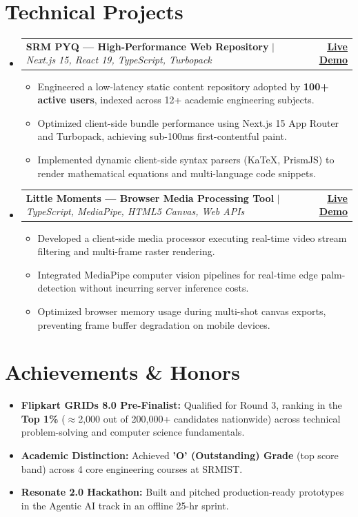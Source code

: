 \documentclass[letterpaper,10pt]{article}
\makeatletter
\newcommand{\resumeItem}[1]{
  \item\small{
    {#1 \vspace{-2pt}}
  }
}
\newcommand{\resumeProjectHeading}[2]{
    \item
    \begin{tabular*}{1.0\textwidth}[t]{l@{\extracolsep{\fill}}r}
      \small#1 & \textbf{\small #2}\\
    \end{tabular*}\vspace{-4pt}
}
\newcommand{\resumeSubHeadingListStart}{\begin{itemize}[leftmargin=0.0in, label={}]}
\newcommand{\resumeSubHeadingListEnd}{\end{itemize}}
\newcommand{\resumeItemListStart}{\begin{itemize}[leftmargin=0.15in, label=\raisebox{0.15ex}{\tiny$\bullet$}, itemsep=1.5pt]}
\newcommand{\resumeItemListEnd}{\end{itemize}\vspace{-3pt}}
\makeatother
\begin{document}
\section{Technical Projects}
    \resumeSubHeadingListStart
      \resumeProjectHeading
          {\textbf{SRM PYQ --- High-Performance Web Repository} $|$ \emph{Next.js 15, React 19, TypeScript, Turbopack}}{\href{https://srm-pyq.vercel.app/}{\underline{Live Demo}}}
          \resumeItemListStart
            \resumeItem{Engineered a low-latency static content repository adopted by \textbf{100+ active users}, indexed across 12+ academic engineering subjects.}
            \resumeItem{Optimized client-side bundle performance using Next.js 15 App Router and Turbopack, achieving sub-100ms first-contentful paint.}
            \resumeItem{Implemented dynamic client-side syntax parsers (KaTeX, PrismJS) to render mathematical equations and multi-language code snippets.}
          \resumeItemListEnd

      \resumeProjectHeading
          {\textbf{Little Moments --- Browser Media Processing Tool} $|$ \emph{TypeScript, MediaPipe, HTML5 Canvas, Web APIs}}{\href{https://lilmom.vercel.app/}{\underline{Live Demo}}}
          \resumeItemListStart
            \resumeItem{Developed a client-side media processor executing real-time video stream filtering and multi-frame raster rendering.}
            \resumeItem{Integrated MediaPipe computer vision pipelines for real-time edge palm-detection without incurring server inference costs.}
            \resumeItem{Optimized browser memory usage during multi-shot canvas exports, preventing frame buffer degradation on mobile devices.}
          \resumeItemListEnd
    \resumeSubHeadingListEnd

\section{Achievements \& Honors}
    \resumeSubHeadingListStart
        \resumeItemListStart
            \resumeItem{\textbf{Flipkart GRIDs 8.0 Pre-Finalist:} Qualified for Round 3, ranking in the \textbf{Top 1\%} ($\approx$2,000 out of 200,000+ candidates nationwide) across technical problem-solving and computer science fundamentals.}
            \resumeItem{\textbf{Academic Distinction:} Achieved \textbf{'O' (Outstanding) Grade} (top score band) across 4 core engineering courses at SRMIST.}
            \resumeItem{\textbf{Resonate 2.0 Hackathon:} Built and pitched production-ready prototypes in the Agentic AI track in an offline 25-hr sprint.}
        \resumeItemListEnd
    \resumeSubHeadingListEnd
\end{document}
